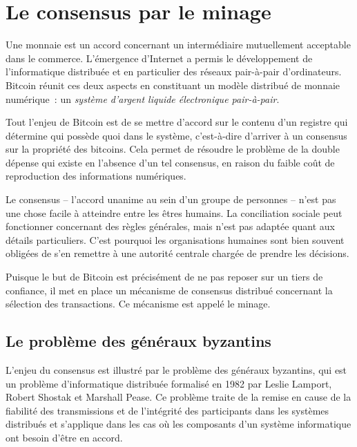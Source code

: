 
\chapter{Le consensus par le minage}
\label{ch:confirmation}

Une monnaie est un accord concernant un intermédiaire mutuellement acceptable dans le commerce. L'émergence d'Internet a permis le développement de l'informatique distribuée et en particulier des réseaux pair-à-pair d'ordinateurs. Bitcoin réunit ces deux aspects en constituant un modèle distribué de monnaie numérique~: un \emph{système d'argent liquide électronique pair-à-pair}.


Tout l'enjeu de Bitcoin est de se mettre d'accord sur le contenu d'un registre qui détermine qui possède quoi dans le système, c'est-à-dire d'arriver à un consensus sur la propriété des bitcoins. Cela permet de résoudre le problème de la double dépense qui existe en l'absence d'un tel consensus, en raison du faible coût de reproduction des informations numériques.

Le consensus -- l'accord unanime au sein d'un groupe de personnes -- n'est pas une chose facile à atteindre entre les êtres humains. La conciliation sociale peut fonctionner concernant des règles générales, mais n'est pas adaptée quant aux détails particuliers. C'est pourquoi les organisations humaines sont bien souvent obligées de s'en remettre à une autorité centrale chargée de prendre les décisions.

Puisque le but de Bitcoin est précisément de ne pas reposer sur un tiers de confiance, il met en place un mécanisme de consensus distribué concernant la sélection des transactions. Ce mécanisme est appelé le minage.


\section*{Le problème des généraux byzantins} %

L'enjeu du consensus est illustré par le problème des généraux byzantins, qui est un problème d'informatique distribuée formalisé en 1982 par Leslie Lamport, Robert Shostak et Marshall Pease. Ce problème traite de la remise en cause de la fiabilité des transmissions et de l'intégrité des participants dans les systèmes distribués et s'applique dans les cas où les composants d'un système informatique ont besoin d'être en accord.

